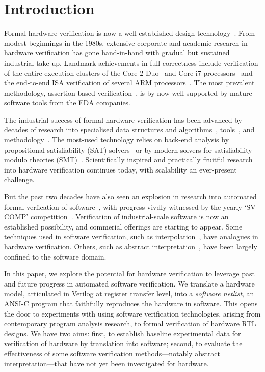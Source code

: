 \section{Introduction}\label{sec:intro}
%
Formal hardware verification is now a well-established design technology~\cite{Seligman:2015:FV}. From modest beginnings in the 1980s, extensive corporate and academic research in hardware verification has gone hand-in-hand with gradual but sustained industrial take-up.  Landmark achievements in full correctness include verification of the entire execution clusters of the Core 2 Duo~\cite{Core2}  and Core i7 processors~\cite{i7} and the end-to-end ISA verification of several ARM processors~\cite{ARM}. The most prevalent methodology, assertion-based verification~\cite{Foster:2009:AAB}, is by now well supported by mature software tools from the EDA companies.

The industrial success of formal hardware verification has been advanced by decades of research into specialised data structures and algorithms~\cite{ic3,fmcad2000,ken,biere,STE}, tools~\cite{Seger:2005:IEE,abc,ebmc,vis,cadence,synopsysfv}, and methodology~\cite{MCMILLAN2000279,Aagaard:2000:MLH,uclid,word-term,word-bmc,DBLP:conf/lpar/AndrausLS08}.  The most-used technology relies on back-end analysis by propositional satisfiability (SAT) solvers~\cite{Biere1999} or by modern solvers for satisfiability modulo theories (SMT)~\cite{decision_procedures, DBLP:conf/lpar/AndrausLS08,soc-keating,
DBLP:conf/mtv/SunkariCVM07,DBLP:conf/cav/Bjesse08}. Scientifically inspired and practically fruitful research into hardware verification continues today, with scalability an ever-present challenge.

But the past two decades have also seen an explosion in research into automated formal verfication of software~\cite{dkw2008}, with progress vivdly witnessed by the yearly `SV-COMP' competition~\cite{Beyer2017}.  Verification of industrial-scale software is now an established possibility, and commerial offerings are starting to appear. Some techniques used in software verification, such as interpolation~\cite{Interpolants,Kroening:2011:ISV}, have analogues in hardware verification. Others, such as abstract interpretation~\cite{CousotCousot77,Cousot:1996:AI}, have been largely confined to the software domain.  

In this paper, we explore the potential for hardware verification to leverage past and future progress in automated software verification. We translate a hardware model, articulated in Verilog at register transfer level, into a \emph{software netlist}, an ANSI-C program that faithfully reproduces the hardware in software. This opens the door to experiments with using software verification technologies, arising from contemporary program analysis research, to formal verification of hardware RTL designs. We have two aims: first, to establish baseline experimental data for verification of hardware by translation into software; second, to evaluate the effectiveness of some software verification methods---notably abstract interpretation---that have not yet been investigated for hardware.  

